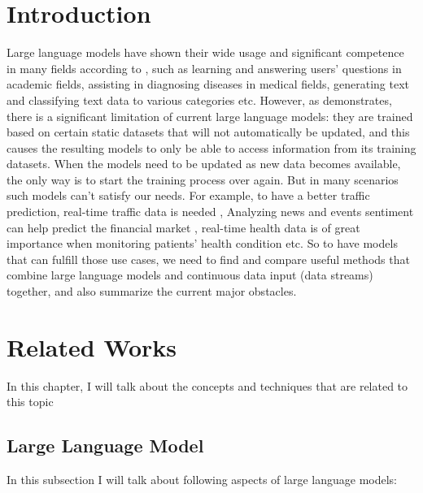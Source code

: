 \documentclass[runningheads]{llncs}
\begin{document}
\section{Introduction}
Large language models have shown their wide usage and significant competence in many fields according to \cite{Liu23}, such as learning and answering users' questions in academic fields,
assisting in diagnosing diseases in medical fields, generating text and classifying text data to various categories etc. However, as \cite{Gupta23} demonstrates, 
there is a significant limitation of current large language models: they are trained based on certain static datasets that will not automatically be updated, and this causes the resulting models to only be able to access information from its training datasets. 
When the models need to be updated as new data becomes available, the only way is to start the training process over again. But in many scenarios such models can't satisfy our needs. 
For example, to have a better traffic prediction, real-time traffic data is needed \cite{Zhang24},
Analyzing news and events sentiment can help predict the financial market \cite{Araci19}, 
real-time health data is of great importance when monitoring patients' health condition \cite{Thiru23} etc.
So to have models that can fulfill those use cases, we need to find and compare useful methods that combine large language models and continuous data input (data streams) together, and also summarize the current major obstacles. 

\section{Related Works}
In this chapter, I will talk about the concepts and techniques that are related to this topic

\subsection{Large Language Model}
In this subsection I will talk about following aspects of large language models:
\end{document}
